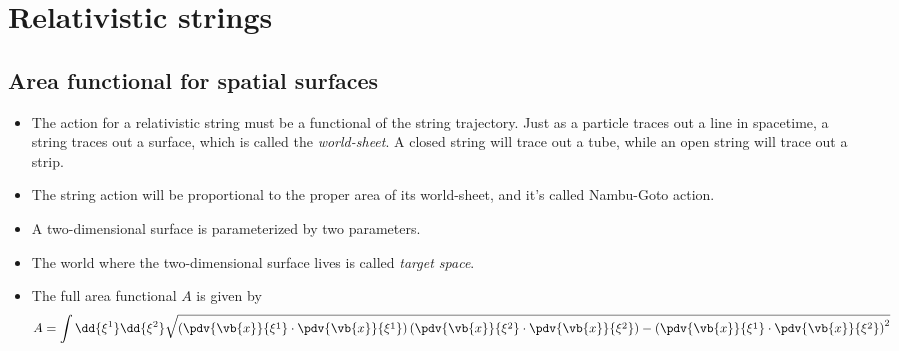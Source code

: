\documentclass[12pt]{report}
\begin{document}
\chapter{Relativistic strings}
\newpage
\section{Area functional for spatial surfaces}
\begin{itemize}
    \item The action for a relativistic string must be a functional of the string trajectory. Just as a particle traces out a line in spacetime, a string traces out a surface, which is called the \textit{world-sheet}. A closed string will trace out a tube, while an open string will trace out a strip.
    \item The string action will be proportional to the proper area of its world-sheet, and it's called Nambu-Goto action.
    \item A two-dimensional surface is parameterized by two parameters.
    \item The world where the two-dimensional surface lives is called \textit{target space}.
    \item The full area functional $A$ is given by
    $$A = \int \dd{\xi^1}\dd{\xi^2}\sqrt{\left(\pdv{\vb{x}}{\xi^1}\cdot\pdv{\vb{x}}{\xi^1} \right)\left(\pdv{\vb{x}}{\xi^2}\cdot\pdv{\vb{x}}{\xi^2} \right)-\left(\pdv{\vb{x}}{\xi^1}\cdot \pdv{\vb{x}}{\xi^2} \right)^2}$$
\end{itemize}
\end{document}
